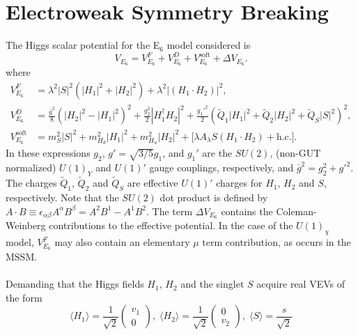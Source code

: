 \documentclass[preprint,amsmath,amssymb,aps,superscriptaddress,prd,showpacs,floatfix]{revtex4-1}
\begin{document}
 



\section{\label{sec:ewsb}Electroweak Symmetry Breaking}
The Higgs scalar potential for the E$_6$ model considered is \cite{King:2005jy} 
\begin{equation}\label{eq:E6VeffOneLoop}
V_{E_6}=V_{E_6}^F+V_{E_6}^D+V_{E_6}^{\textrm{soft}}+\Delta V_{E_6}.
\end{equation}
where
\begin{align}
V_{E_6}^F&=\lambda^2|S|^2(|H_1|^2+|H_2|^2)+\lambda^2|(H_1\cdot H_2)|^2,\label{eq:E6VFterms}\\
V_{E_6}^D&=\frac{\bar{g}^2}{8}\left ( |H_2|^2-|H_1|^2\right )^2+\frac{g_2^2}{2}|H_1^\dagger H_2|^2+\frac{g_1'^2}{2}(\tilde{Q}_1|H_1|^2+\tilde{Q}_2|H_2|^2+\tilde{Q}_S|S|^2)^2,\label{eq:E6VDterms}\\
V_{E_6}^{\textrm{soft}}&=m_S^2|S|^2+m_{H_d}^2|H_1|^2+m_{H_u}^2|H_2|^2+\Big [\lambda A_\lambda S(H_1\cdot H_2)+\textrm{h.c.}\Big ].\label{eq:E6Vsoft}
\end{align}
In these expressions $g_2$, $g'=\sqrt{3/5}g_1$, and $g_1'$ are the $SU(2)$, (non-GUT normalized) $U(1)_Y$ and $U(1)'$ gauge couplings, respectively, and $\bar{g}^2=g_2^2+g'^2$. The charges $\tilde{Q}_1$, $\tilde{Q}_2$ and $\tilde{Q}_S$ are effective $U(1)'$ charges for $H_1$, $H_2$ and $S$, respectively. Note that the $SU(2)$ dot product is defined by $A\cdot B\equiv \epsilon_{\alpha\beta}A^\alpha B^\beta=A^2B^1-A^1B^2$. The term $\Delta V_{E_6}$ contains the Coleman-Weinberg contributions to the effective potential. In the case of the $U(1)_\chi$ model, $V_{E_6}^F$ may also contain an elementary $\mu$ term contribution, as occurs in the MSSM.\\ \\
Demanding that the Higgs fields $H_1$, $H_2$ and the singlet $S$ acquire real VEVs of the form
\begin{equation}\label{eq:E6vevs}
\langle H_1 \rangle = \frac{1}{\sqrt{2}}\begin{pmatrix} v_1 \\ 0\end{pmatrix}, \; \langle H_2 \rangle = \frac{1}{\sqrt{2}}\begin{pmatrix} 0 \\ v_2 \end{pmatrix}, \; \langle S \rangle =\frac{s}{\sqrt{2}}
\end{equation}
\end{document}
